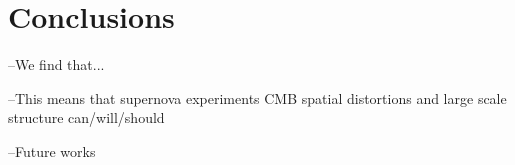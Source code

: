 \documentclass[aps,prd,reprint,superscriptaddress]{revtex4-1}
\begin{document}
\section{Conclusions \label{sec:conclusions}}
--We find that...

--This means that supernova experiments CMB spatial distortions and large scale structure can/will/should

--Future works

%


\appendix
\end{document}
